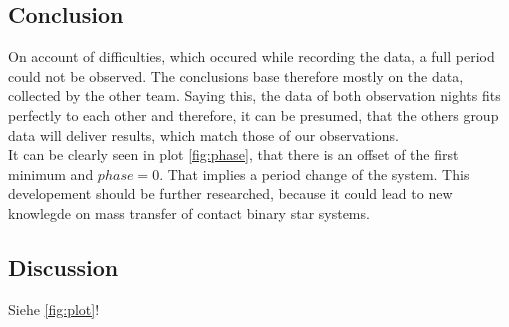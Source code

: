 \subsection{Conclusion}
  \label{sec:fuckoff}
  On account of difficulties, which occured while recording the data, a full period could not
  be observed. The conclusions base therefore mostly on the data, collected by the other team.
  Saying this, the data of both observation nights fits perfectly to each other and therefore, 
  it can be presumed, that the others group data will deliver results, which match those of our 
  observations.\\
  It can be clearly seen in plot \ref{fig:phase}, that there is an offset of the first minimum 
  and $phase = 0$. That implies a period change of the system. This developement should be 
  further researched, because it could lead to new knowlegde on mass transfer of contact binary
  star systems.

\subsection{Discussion}
  \label{sec:orange}




Siehe \autoref{fig:plot}!

